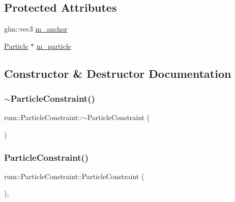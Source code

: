\subsection*{Protected Attributes}
\begin{DoxyCompactItemize}
\item 
glm\+::vec3 \mbox{\hyperlink{classrum_1_1_particle_constraint_a9822cd4e0be33424d7b3ffe0dce583a8}{m\+\_\+anchor}}
\item 
\mbox{\hyperlink{classrum_1_1_particle}{Particle}} $\ast$ \mbox{\hyperlink{classrum_1_1_particle_constraint_a78a37fb2e7d93ebdace6020a484ab35e}{m\+\_\+particle}}
\end{DoxyCompactItemize}


\subsection{Constructor \& Destructor Documentation}
\mbox{\label{classrum_1_1_particle_constraint_a746b1856af604ddc7e0b763114b11d43}} 
\subsubsection{\texorpdfstring{$\sim$\+Particle\+Constraint()}{~ParticleConstraint()}}
{\footnotesize\ttfamily rum\+::\+Particle\+Constraint\+::$\sim$\+Particle\+Constraint (\begin{DoxyParamCaption}{ }\end{DoxyParamCaption})\hspace{0.3cm}{\ttfamily [virtual]}}

\mbox{\label{classrum_1_1_particle_constraint_aee5151f3813c45df9e65bf5ae29ba1d1}} 
\subsubsection{\texorpdfstring{Particle\+Constraint()}{ParticleConstraint()}}
{\footnotesize\ttfamily rum\+::\+Particle\+Constraint\+::\+Particle\+Constraint (\begin{DoxyParamCaption}{ }\end{DoxyParamCaption})\hspace{0.3cm}{\ttfamily [explicit]}, {\ttfamily [protected]}}



